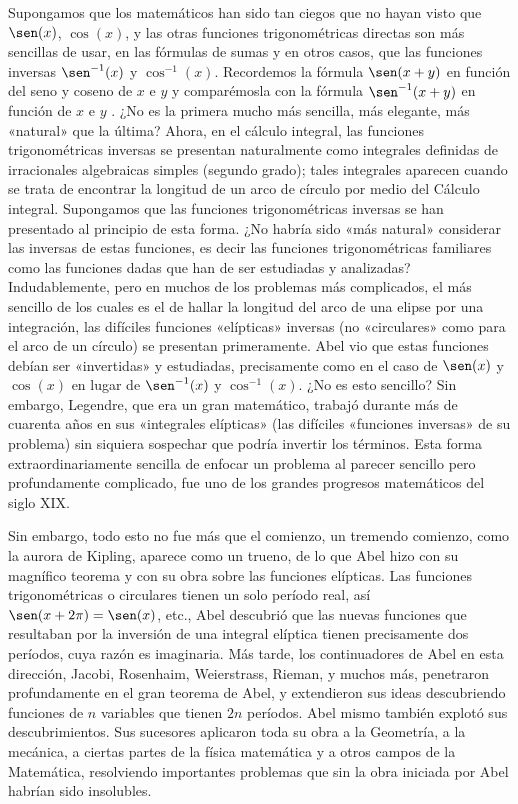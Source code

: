 \documentclass[a4paper, 12pt, draft]{article}
\begin{document}
Supongamos que los matemáticos han sido tan ciegos que no hayan visto que $\sen(x)$, $\cos(x)$, y las otras funciones trigonométricas directas son más sencillas de usar, en las fórmulas de sumas y en otros casos, que las funciones inversas $\sen^{-1}(x)$ y $\cos^{-1}(x)$. Recordemos la fórmula $\sen ( x + y )$ en función del seno y coseno de $x$ e $y$ y comparémosla con la fórmula $\sen^{-1} ( x + y)$ en función de $x$ e $y$ . ¿No es la primera mucho más sencilla, más elegante, más «natural» que la última? Ahora, en el cálculo integral, las funciones trigonométricas inversas se presentan naturalmente como integrales definidas de irracionales algebraicas simples (segundo grado); tales integrales aparecen cuando se trata de encontrar la longitud de un arco de círculo por medio del Cálculo integral. Supongamos que las funciones trigonométricas inversas se han presentado al principio de esta forma. ¿No habría sido «más natural» considerar las inversas de estas funciones, es decir las funciones trigonométricas familiares como las funciones dadas que han de ser estudiadas y analizadas? Indudablemente, pero en muchos de los problemas más complicados, el más sencillo de los cuales es el de hallar la longitud del arco de una elipse por una integración, las difíciles funciones «elípticas» inversas (no «circulares» como para el arco de un círculo) se presentan primeramente. Abel vio que estas funciones debían ser «invertidas» y estudiadas, precisamente como en el caso de $\sen(x)$ y $\cos(x)$ en lugar de $\sen^{-1}(x)$ y $\cos^{ -1}(x)$. ¿No es esto sencillo? Sin embargo, Legendre, que era un gran matemático, trabajó durante más de cuarenta años en sus «integrales elípticas» (las difíciles «funciones inversas» de su problema) sin siquiera sospechar que podría invertir los términos. Esta forma extraordinariamente sencilla de enfocar un problema al parecer sencillo pero profundamente complicado, fue uno de los grandes progresos matemáticos del siglo XIX.

Sin embargo, todo esto no fue más que el comienzo, un tremendo comienzo, como la aurora de Kipling, aparece como un trueno, de lo que Abel hizo con su magnífico teorema y con su obra sobre las funciones elípticas. Las funciones trigonométricas o circulares tienen un solo período real, así $\sen( x + 2 \pi ) = \sen (x)$, etc., Abel descubrió que las nuevas funciones que resultaban por la inversión de una integral elíptica tienen precisamente dos períodos, cuya razón es imaginaria. Más tarde, los continuadores de Abel en esta dirección, Jacobi, Rosenhaim, Weierstrass, Rieman, y muchos más, penetraron profundamente en el gran teorema de Abel, y extendieron sus ideas descubriendo funciones de $n$ variables que tienen $2n$ períodos. Abel mismo también explotó sus descubrimientos. Sus sucesores aplicaron toda su obra a la Geometría, a la mecánica, a ciertas partes de la física matemática y a otros campos de la Matemática, resolviendo importantes problemas que sin la obra iniciada por Abel habrían sido insolubles.
\end{document}
